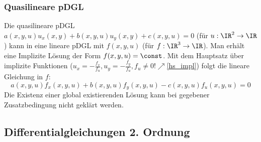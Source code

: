 	\subsubsection{Quasilineare pDGL}
	Die quasilineare pDGL $	a(x,y,u)u_x(x,y)+b(x,y,u)u_y(x,y)+c(x,y,u)=0$ (für $u:\IR^2\rightarrow \IR$) kann in eine lineare pDGL mit $f(x,y,u)$ (für $f:\IR^3\rightarrow \IR$). Man erhält eine Implizite Lösung der Form $f(x,y,u)=\const$. Mit dem Hauptsatz über implizite Funktionen ($u_x=-\frac{f_x}{f_u},u_y=-\frac{f_y}{f_u},f_u\neq0!\nearrow$\ref{hs_impl}) folgt die lineare Gleichung in $f$:
	\begin{equation}
			a(x,y,u)f_x(x,y,u)+b(x,y,u)f_y(x,y,u)-c(x,y,u)f_u(x,y,u)=0
	\end{equation}
	Die Existenz einer global existierenden Lösung kann bei gegebener Zusatzbedingung nicht geklärt werden.
\subsection{Differentialgleichungen 2. Ordnung}
